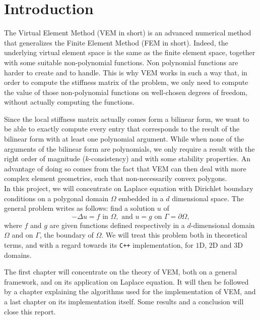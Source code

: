 \newpage
\section*{Introduction} 

The Virtual Element Method (VEM in short) is an advanced numerical method that generalizes the Finite Element Method (FEM in short). Indeed, the underlying virtual element space is the same as the finite element space, together with some suitable non-polynomial functions. Non polynomial functions are harder to create and to handle. This is why VEM works in such a way that, in order to compute the stiffness matrix of the problem, we only need to compute the value of those non-polynomial functions on well-chosen degrees of freedom, without actually computing the functions. 

Since the local stiffness matrix actually comes form a bilinear form, we want to be able to exactly compute every entry that corresponds to the result of the bilinear form with at least one polynomial argument. While when none of the arguments of the bilinear form are polynomials, we only require a result with the right order of magnitude ($k$-consistency) and with some stability properties. An advantage of doing so comes from the fact that VEM can then deal with more complex element geometries, such that non-necessarily convex polygons.\\

In this project, we will concentrate on Laplace equation with Dirichlet boundary conditions on a polygonal domain $\Omega$ embedded in a $d$ dimensional space. The general problem writes as follows: find a solution $u$ of
$$ -\Delta u = f \text{ in } \Omega, \text{ and } u = g \text{ on } \Gamma = \partial \Omega, $$
where $f$ and $g$ are given functions defined respectively in a $d$-dimensional domain $\Omega$ and on $\Gamma$, the boundary of $\Omega$.
We will treat this problem both in theoretical terms, and with a regard towards its \verb!C++! implementation, for $1$D, $2$D and $3$D domains. \newline

The first chapter will concentrate on the theory of VEM, both on a general framework, and on its application on Laplace equation. It will then be followed by a chapter explaining the algorithms used for the implementation of VEM, and a last chapter on its implementation itself. Some results and a conclusion will close this report. 


